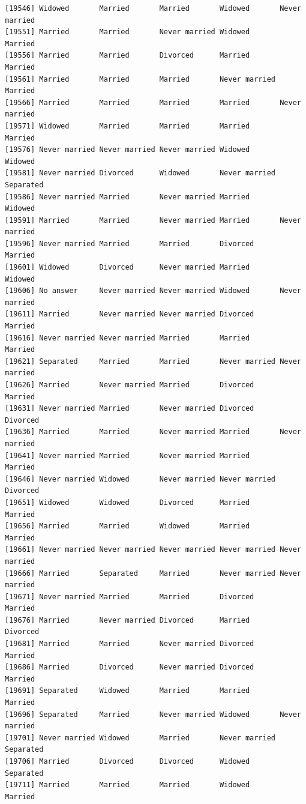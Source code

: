 \documentclass[
  letterpaper,
  DIV=11,
  numbers=noendperiod,
  oneside]{scrartcl}
\begin{document}
\begin{verbatim}
[19546] Widowed       Married       Married       Widowed       Never married
[19551] Married       Married       Never married Widowed       Married      
[19556] Married       Married       Divorced      Married       Married      
[19561] Married       Married       Married       Never married Married      
[19566] Married       Married       Married       Married       Never married
[19571] Widowed       Married       Married       Married       Married      
[19576] Never married Never married Never married Widowed       Widowed      
[19581] Never married Divorced      Widowed       Never married Separated    
[19586] Never married Married       Never married Married       Widowed      
[19591] Married       Married       Never married Married       Never married
[19596] Never married Married       Married       Divorced      Married      
[19601] Widowed       Divorced      Never married Married       Widowed      
[19606] No answer     Never married Never married Widowed       Never married
[19611] Married       Never married Never married Divorced      Married      
[19616] Never married Never married Married       Married       Married      
[19621] Separated     Married       Married       Never married Never married
[19626] Married       Never married Married       Divorced      Married      
[19631] Never married Married       Never married Divorced      Divorced     
[19636] Married       Married       Never married Married       Never married
[19641] Never married Married       Never married Married       Married      
[19646] Never married Widowed       Never married Never married Divorced     
[19651] Widowed       Widowed       Divorced      Married       Married      
[19656] Married       Married       Widowed       Married       Married      
[19661] Never married Never married Never married Never married Never married
[19666] Married       Separated     Married       Never married Never married
[19671] Never married Married       Married       Divorced      Married      
[19676] Married       Never married Divorced      Married       Divorced     
[19681] Married       Married       Never married Divorced      Married      
[19686] Married       Divorced      Never married Divorced      Married      
[19691] Separated     Widowed       Married       Married       Married      
[19696] Separated     Married       Never married Widowed       Never married
[19701] Never married Widowed       Married       Never married Separated    
[19706] Married       Divorced      Divorced      Widowed       Separated    
[19711] Married       Married       Married       Widowed       Married      

\end{verbatim}
\end{document}
